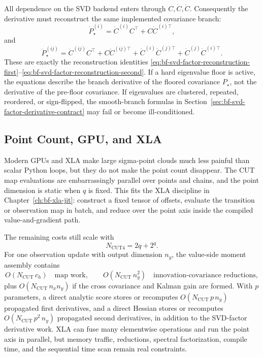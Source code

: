 All dependence on the SVD backend enters through
$C,\dot C,\ddot C$.  Consequently the derivative must reconstruct the same
implemented covariance branch:
\[
  \dot P_\star^{(i)}
  =
  \dot C^{(i)}C^\top+C\dot C^{(i)\top},
\]
and
\[
  \ddot P_\star^{(ij)}
  =
  \ddot C^{(ij)}C^\top+C\ddot C^{(ij)\top}
  +\dot C^{(i)}\dot C^{(j)\top}
  +\dot C^{(j)}\dot C^{(i)\top}.
\]
These are exactly the reconstruction identities
\eqref{eq:bf-svd-factor-reconstruction-first}--\eqref{eq:bf-svd-factor-reconstruction-second}.
If a hard eigenvalue floor is active, the equations describe the branch
derivative of the floored covariance $P_\star$, not the derivative of the
pre-floor covariance.  If eigenvalues are clustered, repeated, reordered, or
sign-flipped, the smooth-branch formulas in
Section~\ref{sec:bf-svd-factor-derivative-contract} may fail or become
ill-conditioned.

\subsection{Point Count, GPU, and XLA}
\label{sec:bf-svd-cut-gpu-xla}

Modern GPUs and XLA make large sigma-point clouds much less painful than
scalar Python loops, but they do not make the point count disappear.  The CUT
map evaluations are embarrassingly parallel over points and chains, and the
point dimension is static when $q$ is fixed.  This fits the XLA discipline in
Chapter~\ref{ch:bf-xla-jit}: construct a fixed tensor of offsets, evaluate the
transition or observation map in batch, and reduce over the point axis inside
the compiled value-and-gradient path.

The remaining costs still scale with
\[
  N_{\mathrm{CUT4}}=2q+2^q .
\]
For one observation update with output dimension $n_y$, the value-side moment
assembly contains
\[
  O(N_{\mathrm{CUT}}\,c_h)
  \quad\text{map work},\qquad
  O(N_{\mathrm{CUT}}\,n_y^2)
  \quad\text{innovation-covariance reductions},
\]
plus
$O(N_{\mathrm{CUT}}\,n_x n_y)$ if the cross covariance and Kalman gain are
formed.  With $p$ parameters, a direct analytic score stores or recomputes
$O(N_{\mathrm{CUT}}\,p\,n_y)$ propagated first derivatives, and a direct
Hessian stores or recomputes
$O(N_{\mathrm{CUT}}\,p^2\,n_y)$ propagated second derivatives, in addition to
the SVD-factor derivative work.  XLA can fuse many elementwise operations and
run the point axis in parallel, but memory traffic, reductions, spectral
factorization, compile time, and the sequential time scan remain real
constraints.

